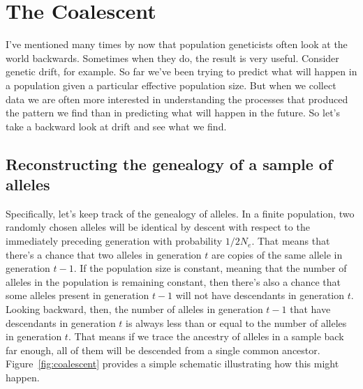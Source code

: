 \chapter{The Coalescent}

I've mentioned many times by now that population geneticists often
look at the world backwards. Sometimes when they do, the result is
very useful. Consider genetic drift, for example. So far we've been
trying to predict what will happen in a population given a particular
effective population size. But when we collect data we are often more
interested in understanding the processes that produced the pattern we
find than in predicting what will happen in the future. So let's take
a backward look at drift and see what we find.


\section*{Reconstructing the genealogy of a sample of
  alleles}

Specifically, let's keep track of the genealogy of alleles. In a
finite population, two randomly chosen alleles will be identical by
descent with respect to the immediately preceding generation with
probability $1/2N_e$. That means that there's a chance that two
alleles in generation $t$ are copies of the same allele in generation
$t-1$. If the population size is constant, meaning that the number of
alleles in the population is remaining constant, then there's also a
chance that some alleles present in generation $t-1$ will not have
descendants in generation $t$. Looking backward, then, the number of
alleles in generation $t-1$ that have descendants in generation $t$ is
always less than or equal to the number of alleles in generation
$t$. That means if we trace the ancestry of alleles in a sample back
far enough, all of them will be descended from a single common
ancestor. Figure~\ref{fig:coalescent} provides a simple schematic
illustrating how this might happen.

